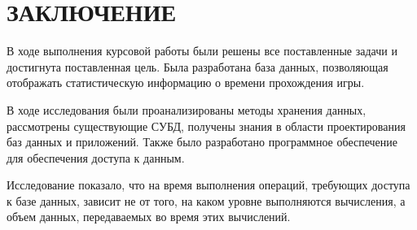 \chapter*{ЗАКЛЮЧЕНИЕ}


В ходе выполнения курсовой работы были решены все поставленные задачи и достигнута поставленная цель. Была разработана база данных, позволяющая отображать статистическую информацию о времени прохождения игры.

В ходе исследования были проанализированы методы хранения данных, рассмотрены существующие СУБД, получены знания в области проектирования баз данных и приложений. Также было разработано программное обеспечение для обеспечения доступа к данным.

Исследование показало, что на время выполнения операций, требующих доступа к базе данных, зависит не от того, на каком уровне выполняются вычисления, а объем данных, передаваемых во время этих вычислений.




